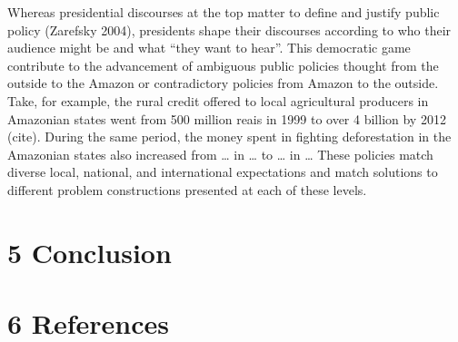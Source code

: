 \documentclass[
]{article}
\begin{document}
Whereas presidential discourses at the top matter to define and justify
public policy (Zarefsky 2004), presidents shape their discourses
according to who their audience might be and what ``they want to hear''.
This democratic game contribute to the advancement of ambiguous public
policies thought from the outside to the Amazon or contradictory
policies from Amazon to the outside. Take, for example, the rural credit
offered to local agricultural producers in Amazonian states went from
500 million reais in 1999 to over 4 billion by 2012 (cite). During the
same period, the money spent in fighting deforestation in the Amazonian
states also increased from \ldots{} in \ldots{} to \ldots{} in \ldots{}
These policies match diverse local, national, and international
expectations and match solutions to different problem constructions
presented at each of these levels.

\hypertarget{conclusion}{%
\section{5 Conclusion}\label{conclusion}}

\hypertarget{references}{%
\section*{6 References}\label{references}}
\end{document}
